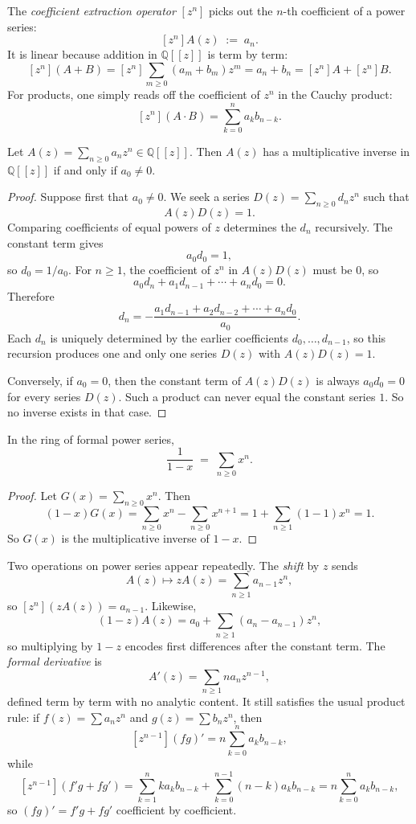 \begin{definition}
The \emph{coefficient extraction operator} $[z^n]$ picks out the $n$-th coefficient of a power series:
\[
  [z^n] A(z) \;:=\; a_n.
\]
It is linear because addition in $\mathbb{Q}[[z]]$ is term by term:
\[
  [z^n](A+B) = [z^n]\sum_{m \ge 0}(a_m+b_m)z^m = a_n+b_n = [z^n]A + [z^n]B.
\]
For products, one simply reads off the coefficient of $z^n$ in the Cauchy product:
\[
  [z^n](A \cdot B) = \sum_{k=0}^{n} a_k b_{n-k}.
\]
\end{definition}

\begin{proposition}
Let $A(z) = \sum_{n \ge 0} a_n z^n \in \mathbb{Q}[[z]]$. Then $A(z)$ has a multiplicative inverse in $\mathbb{Q}[[z]]$ if and only if $a_0 \ne 0$.
\end{proposition}

\begin{proof}
Suppose first that $a_0 \ne 0$. We seek a series $D(z) = \sum_{n \ge 0} d_n z^n$ such that
\[
  A(z)D(z) = 1.
\]
Comparing coefficients of equal powers of $z$ determines the $d_n$ recursively. The constant term gives
\[
  a_0 d_0 = 1,
\]
so $d_0 = 1/a_0$. For $n \ge 1$, the coefficient of $z^n$ in $A(z)D(z)$ must be $0$, so
\[
  a_0 d_n + a_1 d_{n-1} + \cdots + a_n d_0 = 0.
\]
Therefore
\[
  d_n = -\frac{a_1 d_{n-1} + a_2 d_{n-2} + \cdots + a_n d_0}{a_0}.
\]
Each $d_n$ is uniquely determined by the earlier coefficients $d_0,\dots,d_{n-1}$, so this recursion produces one and only one series $D(z)$ with $A(z)D(z)=1$.

Conversely, if $a_0 = 0$, then the constant term of $A(z)D(z)$ is always $a_0d_0 = 0$ for every series $D(z)$. Such a product can never equal the constant series $1$. So no inverse exists in that case.
\end{proof}

\begin{lemma}
In the ring of formal power series,
\[
  \frac{1}{1-x} \;=\; \sum_{n \ge 0} x^n.
\]
\end{lemma}

\begin{proof}
Let $G(x) = \sum_{n \ge 0} x^n$. Then
\[
  (1-x)G(x)
  = \sum_{n \ge 0} x^n - \sum_{n \ge 0} x^{n+1}
  = 1 + \sum_{n \ge 1}(1-1)x^n
  = 1.
\]
So $G(x)$ is the multiplicative inverse of $1-x$.
\end{proof}

Two operations on power series appear repeatedly. The \emph{shift} by $z$ sends
\[
  A(z) \longmapsto zA(z) = \sum_{n \ge 1} a_{n-1} z^n,
\]
so $[z^n](zA(z)) = a_{n-1}$. Likewise,
\[
  (1-z)A(z) = a_0 + \sum_{n \ge 1}(a_n-a_{n-1})z^n,
\]
so multiplying by $1-z$ encodes first differences after the constant term. The \emph{formal derivative} is
\[
  A'(z) = \sum_{n \ge 1} n a_n z^{n-1},
\]
defined term by term with no analytic content. It still satisfies the usual product rule: if $f(z)=\sum a_n z^n$ and $g(z)=\sum b_n z^n$, then
\[
  [z^{n-1}](fg)' = n\sum_{k=0}^n a_k b_{n-k},
\]
while
\[
  [z^{n-1}](f'g+fg')
  = \sum_{k=1}^n k a_k b_{n-k} + \sum_{k=0}^{n-1} (n-k)a_k b_{n-k}
  = n\sum_{k=0}^n a_k b_{n-k},
\]
so $(fg)' = f'g + fg'$ coefficient by coefficient.

